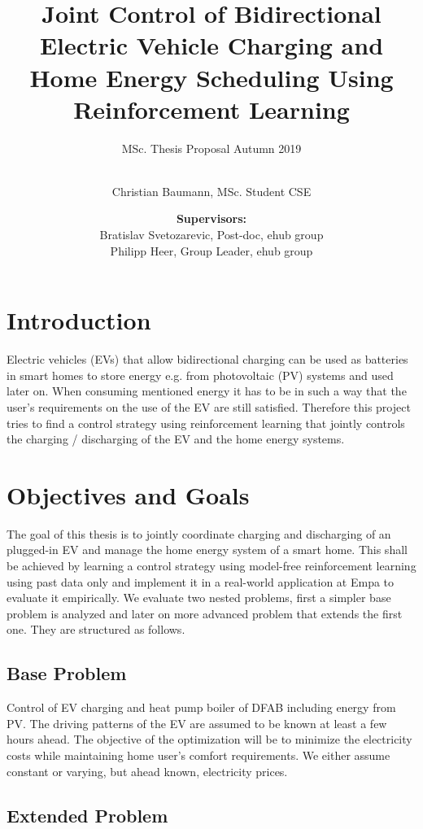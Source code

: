 \documentclass[letterpaper]{scrartcl}
\subtitle{MSc. Thesis Proposal Autumn 2019}
\title{Joint Control of Bidirectional Electric Vehicle 
	Charging and Home Energy Scheduling Using Reinforcement Learning}
\author{\makebox[.9\textwidth]{\textbf{Author:}}\\Christian Baumann, MSc. Student CSE 
\and \textbf{Supervisors:}\\ Bratislav Svetozarevic, Post-doc, ehub group\\ 
Philipp Heer, Group Leader, ehub group}
\begin{document}
	\maketitle
	
	\section{Introduction}
	\label{sec:intro}
	
	Electric vehicles (EVs) that allow bidirectional charging
	can be used as batteries in smart homes to store energy
	e.g. from photovoltaic (PV) systems and used later on. 
	When consuming mentioned energy it has to be in such a way that
	the user's requirements on the use of the EV are still satisfied.
	Therefore this project tries to find a control strategy using
	reinforcement learning that jointly controls the charging / 
	discharging of the EV and the home energy systems.
	
	\section{Objectives and Goals}
	
	The goal of this thesis is to jointly coordinate charging and discharging
	of an plugged-in EV and manage the home energy system of a smart home. This
	shall be achieved by learning a control strategy using model-free
	reinforcement learning using past data only and implement it in a real-world
	application at Empa to evaluate it empirically. We evaluate two nested problems, first a simpler base problem is analyzed and later on more advanced problem
	that extends the first one. They are structured as follows.
	
	\subsection{Base Problem}
	
	Control of EV charging and heat pump boiler of DFAB including energy
	from PV. The driving patterns of the EV are assumed to be known
	at least a few hours ahead. The objective of the optimization will be 
	to minimize the electricity costs while maintaining home user's comfort 
	requirements. We either assume constant or varying, but ahead known, 
	electricity prices.
	
	\subsection{Extended Problem}
	
\end{document}
